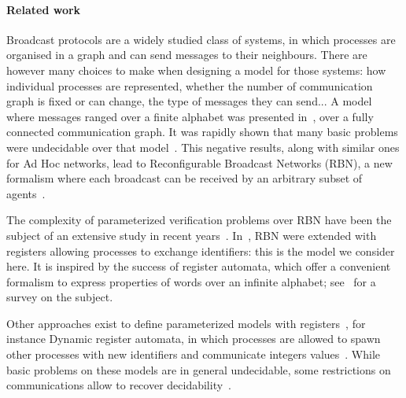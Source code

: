 \paragraph*{Related work}

Broadcast protocols are a widely studied class of systems, in which processes are organised in a graph and can send messages to their neighbours. There are however many choices to make when designing a model for those systems: how individual processes are represented, whether the number of communication graph is fixed or can change, the type of messages they can send... 
A model where messages ranged over a finite alphabet was presented in~\cite{emerson1998model}, over a fully connected communication graph. It was rapidly shown that many basic problems were undecidable over that model~\cite{EsparzaFM1999verification}. This negative results, along with similar ones for Ad Hoc networks, lead to Reconfigurable Broadcast Networks (RBN), a new formalism where each broadcast can be received by an arbitrary subset of agents~\cite{DelzannoSZ2010Adhoc}.

The complexity of parameterized verification problems over RBN have been the subject of an extensive study in recent years~\cite{DelzannoSTZ12, Balasubramanian18, BalasubramanianGW22, DBLP:journals/computing/ChiniMS22}. In~\cite{DelzannoST13}, RBN were extended with registers allowing processes to exchange identifiers: this is the model we consider here. It is inspired by the success of register automata, which offer a convenient formalism to express properties of words over an infinite alphabet; see~\cite{Segoufin06} for a survey on the subject.

Other approaches exist to define parameterized models with registers~\cite{BolligRS21}, for instance Dynamic register automata, in which processes are allowed to spawn other processes with new identifiers and communicate integers values~\cite{AbdullaAKR14}. While basic problems on these models are in general undecidable, some restrictions on communications allow to recover decidability~\cite{AbdullaAKR15, Rezine17}.

